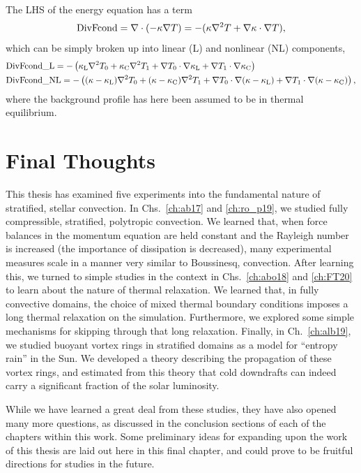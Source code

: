The LHS of the energy equation has a term
\begin{equation}
\text{DivFcond} = \nabla\cdot\left( -\kappa\nabla T\right) 
= -(\kappa\nabla^2 T + \nabla \kappa\cdot\nabla T),
\end{equation}
which can be simply broken up into linear (L) and nonlinear (NL) components,
\begin{equation}
\begin{split}
&\text{DivFcond\_L} = -\left(\kappa_\text{L}\nabla^2 T_0 
+ \kappa_\text{C} \nabla^2 T_1 
+ \nabla T_0 \cdot \nabla \kappa_\text{L}
+ \nabla T_1 \cdot \nabla \kappa_\text{C}\right) \\
&\text{DivFcond\_NL} = -\left(
(\kappa - \kappa_\text{L})\nabla^2 T_0
+ (\kappa - \kappa_\text{C})\nabla^2 T_1
+ \nabla T_0 \cdot \nabla(\kappa - \kappa_\text{L}) 
+ \nabla T_1 \cdot \nabla(\kappa - \kappa_\text{C}) \right),
\end{split}
\end{equation}
where the background profile has here been assumed to be in thermal equilibrium.


\section{Final Thoughts}
\label{sec:final_thoughts}

This thesis has examined five experiments into the fundamental nature of stratified, stellar convection.
In Chs.~\ref{ch:ab17} and \ref{ch:ro_p19}, we studied fully compressible, stratified, polytropic convection.
We learned that, when force balances in the momentum equation are held constant and the Rayleigh number is increased (the importance of dissipation is decreased), many experimental measures scale in a manner very similar to Boussinesq, \RB convection.
After learning this, we turned to simple studies in the \RB context in Chs.~\ref{ch:abo18} and \ref{ch:FT20} to learn about the nature of thermal relaxation.
We learned that, in fully convective domains, the choice of mixed thermal boundary conditions imposes a long thermal relaxation on the simulation.
Furthermore, we explored some simple mechanisms for skipping through that long relaxation.
Finally, in Ch.~\ref{ch:alb19}, we studied buoyant vortex rings in stratified domains as a model for ``entropy rain'' in the Sun.
We developed a theory describing the propagation of these vortex rings, and estimated from this theory that cold downdrafts can indeed carry a significant fraction of the solar luminosity.

While we have learned a great deal from these studies, they have also opened many more questions, as discussed in the conclusion sections of each of the chapters within this work.
Some preliminary ideas for expanding upon the work of this thesis are laid out here in this final chapter, and could prove to be fruitful directions for studies in the future.

